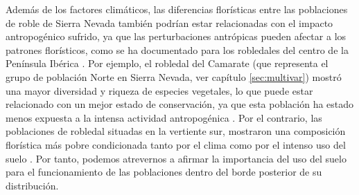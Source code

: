 Además de los factores climáticos, las diferencias florísticas entre las poblaciones de roble de Sierra Nevada también podrían estar relacionadas con el impacto antropogénico sufrido, ya que las perturbaciones antrópicas pueden afectar a los patrones florísticos, como se ha documentado para los robledales del centro de la Península Ibérica \autocite{Gavilanetal2000EffectsDisturbance}. Por ejemplo, el robledal del Camarate (que representa el grupo de población Norte en Sierra Nevada, ver capítulo \ref{sec:multivar}) mostró una mayor diversidad y riqueza de especies vegetales, lo que puede estar relacionado con un mejor estado de conservación, ya que esta población ha estado menos expuesta a la intensa actividad antropogénica \autocite{JimenezOlivencia1991PaisajesSierra}. Por el contrario, las poblaciones de robledal situadas en la vertiente sur, mostraron una composición florística más pobre condicionada tanto por el clima como por el intenso uso del suelo \autocite{CamachoOlmedoetal2002DinamicaEvolutiva,AlAallalietal1998EstudioVegetacion}. Por tanto, podemos atrevernos a afirmar la importancia del uso del suelo para el funcionamiento de las poblaciones dentro del borde posterior de su distribución. 

